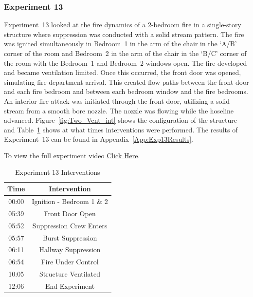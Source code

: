 \documentclass[12pt,oneside]{book}
\begin{document}
\FloatBarrier
\clearpage

\subsubsection{Experiment 13}
Experiment~13 looked at the fire dynamics of a 2-bedroom fire in a single-story structure where suppression was conducted with a solid stream pattern. The fire was ignited simultaneously in Bedroom~1 in the arm of the chair in the `A/B' corner of the room and Bedroom~2 in the arm of the chair in the `B/C' corner of the room with the Bedroom~1 and Bedroom~2 windows open. The fire developed and became ventilation limited. Once this occurred, the front door was opened, simulating fire department arrival. This created flow paths between the front door and each fire bedroom and between each bedroom window and the fire bedrooms. An interior fire attack was initiated through the front door, utilizing a solid stream from a smooth bore nozzle. The nozzle was flowing while the hoseline advanced. Figure~\ref{fig:Two_Vent_int} shows the configuration of the structure and Table~\ref{Table:Exp13Interventions} shows at what times interventions were performed. The results of Experiment~13 can be found in Appendix~\ref{App:Exp13Results}. 

To view the full experiment video \href{https://player.vimeo.com/video/170499618?autoplay=1}{Click Here}.

\begin{table}[H]
	\centering
	\caption{Experiment 13 Interventions}
	\begin{tabular}{|c|c|} 
		\hline
		Time & Intervention \\ \hline \hline
		00:00 & Ignition - Bedroom 1 \& 2 \\ \hline
		05:39 & Front Door Open \\ \hline
		05:52 & Suppression Crew Enters\\ \hline
		05:57 & Burst Suppression \\ \hline 
		06:11 & Hallway Suppression \\ \hline
		06:54 & Fire Under Control 	\\ \hline
		10:05 & Structure Ventilated \\ \hline
		12:06 & End Experiment\\ \hline
	\end{tabular}
	\label{Table:Exp13Interventions}
\end{table}

\FloatBarrier
\clearpage
\end{document}
